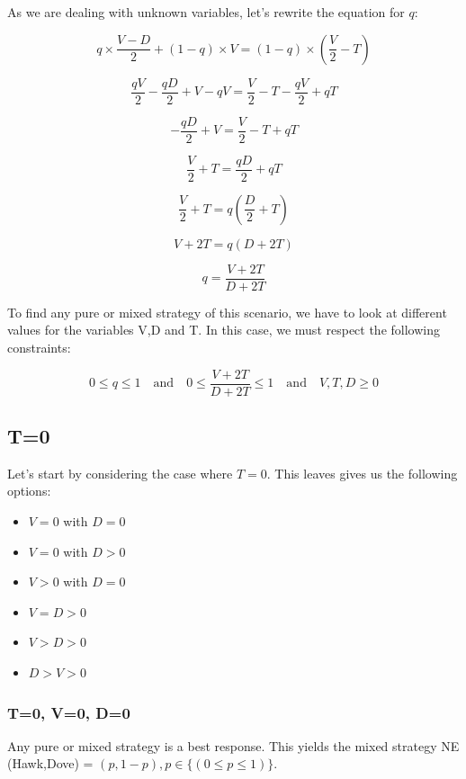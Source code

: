 \documentclass[a4paper, 11pt]{article}
\begin{document}
As we are dealing with unknown variables, let's rewrite the equation for $q$:

\[ q \times \frac{V-D}{2} + (1-q) \times V = (1-q) \times ( \frac{V}{2} - T) \]

\[ \frac{qV}{2} - \frac{qD}{2} + V - qV = \frac{V}{2} - T - \frac{qV}{2} + qT \]

\[ - \frac{qD}{2} + V = \frac{V}{2} - T + qT \]

\[ \frac{V}{2} + T = \frac{qD}{2} + qT \]

\[ \frac{V}{2} + T = q( \frac{D}{2} + T) \]

\[ V + 2T = q( D + 2T) \]

\[ q = \frac{V + 2T}{D + 2T} \]

To find any pure or mixed strategy of this scenario, we have to look at different values for the variables V,D and T. In this case, we must respect the following constraints:

\[ 0\leq q\leq 1 \quad\mathrm{and}\quad 0 \leq \frac{V + 2T}{D + 2T} \leq 1 \quad\mathrm{and}\quad V,T,D \geq 0 \]

\subsection{T=0}

Let's start by considering the case where $T=0$. This leaves gives us the following options: 
\begin{itemize}[noitemsep]
  \item $V=0$ with $D=0$
  \item $V=0$ with $D>0$
  \item $V>0$ with $D=0$
  \item $V=D>0$
  \item $V>D>0$
  \item $D>V>0$
\end{itemize}

\subsubsection{T=0, V=0, D=0}

Any pure or mixed strategy is a best response. This yields the mixed strategy NE (Hawk,Dove) = $(p,1-p), p \in \{(0\leq p \leq 1) \}$.
\end{document}
